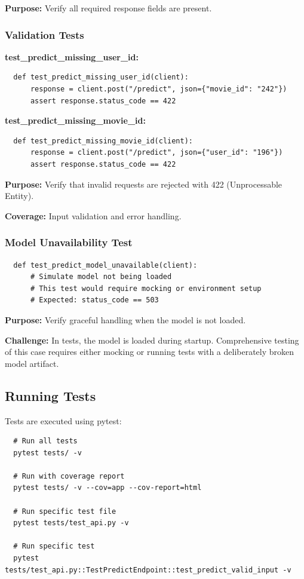 \textbf{Purpose:} Verify all required response fields are present.

\subsubsection{Validation Tests}

\textbf{test\_predict\_missing\_user\_id:}
\begin{verbatim}
  def test_predict_missing_user_id(client):
      response = client.post("/predict", json={"movie_id": "242"})
      assert response.status_code == 422
\end{verbatim}

\textbf{test\_predict\_missing\_movie\_id:}
\begin{verbatim}
  def test_predict_missing_movie_id(client):
      response = client.post("/predict", json={"user_id": "196"})
      assert response.status_code == 422
\end{verbatim}

\textbf{Purpose:} Verify that invalid requests are rejected with 422 (Unprocessable Entity).

\textbf{Coverage:} Input validation and error handling.

\subsubsection{Model Unavailability Test}

\begin{verbatim}
  def test_predict_model_unavailable(client):
      # Simulate model not being loaded
      # This test would require mocking or environment setup
      # Expected: status_code == 503
\end{verbatim}

\textbf{Purpose:} Verify graceful handling when the model is not loaded.

\textbf{Challenge:} In tests, the model is loaded during startup. Comprehensive testing of this case 
requires either mocking or running tests with a deliberately broken model artifact.

\subsection{Running Tests}

Tests are executed using pytest:

\begin{verbatim}
  # Run all tests
  pytest tests/ -v
  
  # Run with coverage report
  pytest tests/ -v --cov=app --cov-report=html
  
  # Run specific test file
  pytest tests/test_api.py -v
  
  # Run specific test
  pytest tests/test_api.py::TestPredictEndpoint::test_predict_valid_input -v
\end{verbatim}

